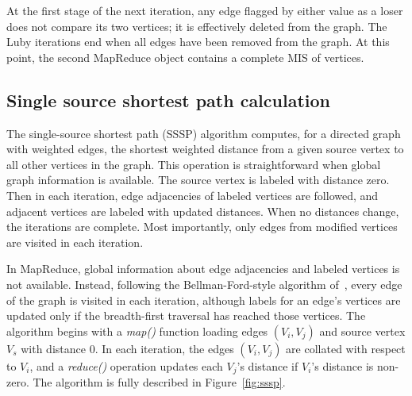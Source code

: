 At the first stage of the next iteration, any edge flagged by either
value as a loser does not compare its two vertices; it is effectively
deleted from the graph.  The Luby iterations end when all edges have
been removed from the graph.  At this point, the second MapReduce
object contains a complete MIS of vertices.

\subsection{Single source shortest path calculation}

The single-source shortest path (SSSP) algorithm computes, for a directed graph
with weighted edges,
the shortest weighted distance from a given source vertex to
all other vertices in the graph.  This operation is straightforward
when global graph information is available.  The source vertex is labeled with
distance zero.  Then in each iteration, edge adjacencies of labeled vertices
are followed, and adjacent vertices are labeled with updated distances.  When
no distances change, the iterations are complete.  Most importantly, only
edges from modified vertices are visited in each iteration.

In MapReduce, global information about edge adjacencies and labeled vertices
is not available.  Instead, following the Bellman-Ford-style 
algorithm of~\cite{SSSPMapReduce, Bellman58, Ford62},
every edge of the graph is visited in each iteration,
although labels for an edge's vertices are updated only if the breadth-first
traversal has reached those vertices.  The algorithm begins with a {\it map()}
function loading edges $(V_i, V_j)$ and source vertex $V_s$ with distance 0.
In each iteration, the edges $(V_i, V_j)$ are collated with respect to
$V_i$, and a {\it reduce()} operation updates each $V_j$'s distance if
$V_i$'s distance is non-zero.  The algorithm is fully described in
Figure~\ref{fig:sssp}.


